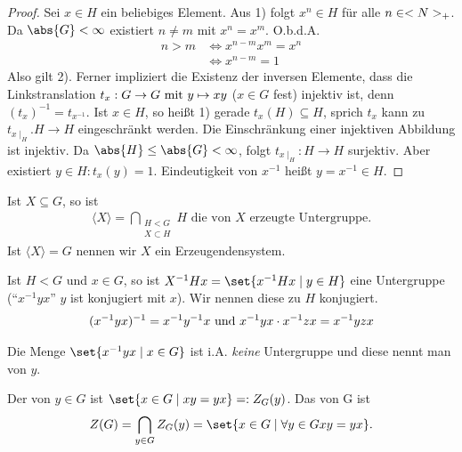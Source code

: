 \begin{proof}
	Sei $x \in H$ ein beliebiges Element. Aus 1) folgt $x^n \in H$ für alle $n \in \N_{+}$. Da $\abs{G}< \infty$ existiert $n\neq m$ mit $x^n = x^m$. O.b.d.A.
	\begin{align*}
		 n > m &\Longleftrightarrow x^{n-m} x^m = x^n\\
		 &\Longleftrightarrow x^{n-m} = 1
	\end{align*}
	Also gilt 2). Ferner impliziert die Existenz der inversen Elemente, dass die Linkstranslation $t_x: G \to G \mit y \mapsto xy$ ($x \in G$ fest) injektiv ist, denn $(t_x)^{-1} = t_{x^{-1}}$. Ist $x \in H$, so heißt 1) gerade $t_x(H) \subseteq H$, sprich $t_x$ kann zu $t_{x\mid_H}. H \to H$ eingeschränkt werden. Die Einschränkung einer injektiven Abbildung ist injektiv. Da $\abs{H} \le \abs{G} < \infty$, folgt $t_{x\mid_H}: H \to H$ surjektiv. Aber existiert $y \in H: t_x(y)= 1$. Eindeutigkeit von $x^{-1}$ heißt $y = x^{-1} \in H$.
\end{proof}
\begin{definition}[Erzeugendensystem]
	Ist $X \subseteq G$, so ist
	\begin{align*}
		\langle X \rangle = \bigcap_{\substack{H < G\\X \subset H}} H \text{ die von $X$ erzeugte Untergruppe}.
	\end{align*}
	Ist $\langle X \rangle = G$ nennen wir $X$ ein Erzeugendensystem.
\end{definition}
\begin{definition}[Konjugation]
	Ist $H < G$ und $x \in G$, so ist $X^{-1}Hx = \set{x^{-1}Hx\mid y \in H}$ eine Untergruppe (``$x^{-1}yx$'' $y$ ist konjugiert mit $x$). Wir nennen diese zu $H$ konjugiert.
	\begin{align*}
		(x^{-1}yx)^{-1} = x^{-1}y^{-1}x \und x^{-1}yx\cdot x^{-1}zx = x^{-1}yzx
	\end{align*}
\end{definition}
\begin{definition}[Konjugationsklasse]
	Die Menge $\set{x^{-1}yx \mid x \in G}$ ist i.A. \emph{keine} Untergruppe und diese nennt man  von $y$.
\end{definition}
\begin{definition}
	Der  von $y \in G$ ist $\set{x \in G \mid xy = yx} =: Z_G(y)$. Das  von G ist
	\begin{align*}
		Z(G) = \bigcap_{y \in G} Z_G(y) = \set{x \in G \mid \forall y \in G xy=yx}.
	\end{align*}
\end{definition}
